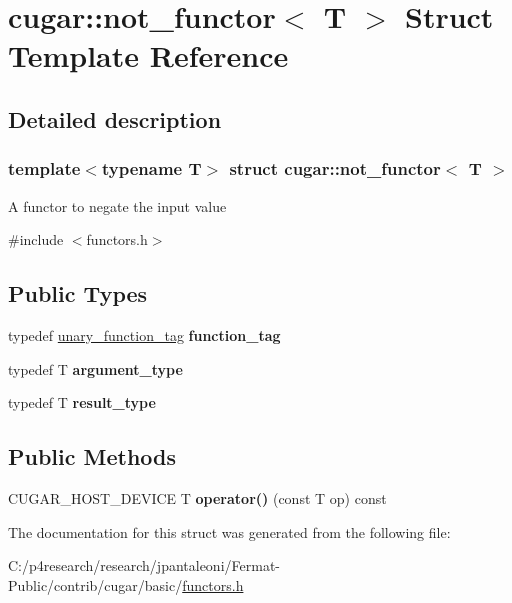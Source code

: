 \hypertarget{structcugar_1_1not__functor}{}\section{cugar\+:\+:not\+\_\+functor$<$ T $>$ Struct Template Reference}
\label{structcugar_1_1not__functor}


\subsection{Detailed description}
\subsubsection*{template$<$typename T$>$\newline
struct cugar\+::not\+\_\+functor$<$ T $>$}

A functor to negate the input value 

{\ttfamily \#include $<$functors.\+h$>$}

\subsection*{Public Types}
\begin{DoxyCompactItemize}
\item 
\mbox{\label{structcugar_1_1not__functor_a87ff877c46c027b2792a2b1ac150b5e9}} 
typedef \hyperlink{structcugar_1_1unary__function__tag}{unary\+\_\+function\+\_\+tag} {\bfseries function\+\_\+tag}
\item 
\mbox{\label{structcugar_1_1not__functor_a0ef2417a2133dc4a56aca2d0b8668fc7}} 
typedef T {\bfseries argument\+\_\+type}
\item 
\mbox{\label{structcugar_1_1not__functor_ab8b0c5292349b59b05a533c5bdbc7c21}} 
typedef T {\bfseries result\+\_\+type}
\end{DoxyCompactItemize}
\subsection*{Public Methods}
\begin{DoxyCompactItemize}
\item 
\mbox{\label{structcugar_1_1not__functor_aed94ab9ff2b99408e755783feb1b9c50}} 
C\+U\+G\+A\+R\+\_\+\+H\+O\+S\+T\+\_\+\+D\+E\+V\+I\+CE T {\bfseries operator()} (const T op) const
\end{DoxyCompactItemize}


The documentation for this struct was generated from the following file\+:\begin{DoxyCompactItemize}
\item 
C\+:/p4research/research/jpantaleoni/\+Fermat-\/\+Public/contrib/cugar/basic/\hyperlink{functors_8h}{functors.\+h}\end{DoxyCompactItemize}
